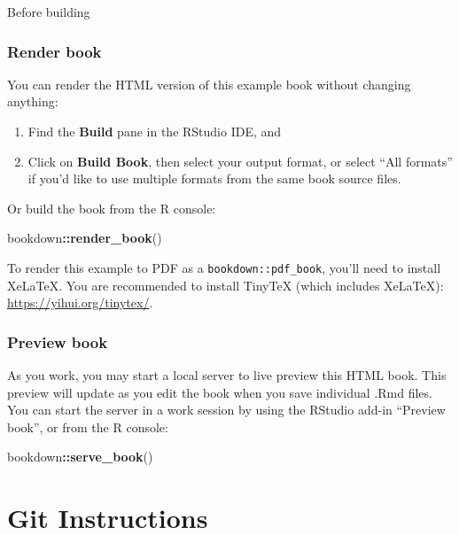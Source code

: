 \documentclass[
]{book}
\newenvironment{Shaded}{\begin{snugshade}}{\end{snugshade}}
\newcommand{\FunctionTok}[1]{\textcolor[rgb]{0.13,0.29,0.53}{\textbf{#1}}}
\newcommand{\NormalTok}[1]{#1}
\newcommand{\SpecialCharTok}[1]{\textcolor[rgb]{0.81,0.36,0.00}{\textbf{#1}}}
\theoremstyle{definition}
\theoremstyle{definition}
\theoremstyle{definition}
\theoremstyle{definition}
\theoremstyle{remark}
\begin{document}
Before building

\subsection{Render book}\label{render-book}

You can render the HTML version of this example book without changing anything:

\begin{enumerate}
\def\labelenumi{\arabic{enumi}.}
\item
  Find the \textbf{Build} pane in the RStudio IDE, and
\item
  Click on \textbf{Build Book}, then select your output format, or select ``All formats'' if you'd like to use multiple formats from the same book source files.
\end{enumerate}

Or build the book from the R console:

\begin{Shaded}
\begin{Highlighting}[]
\NormalTok{bookdown}\SpecialCharTok{::}\FunctionTok{render\_book}\NormalTok{()}
\end{Highlighting}
\end{Shaded}

To render this example to PDF as a \texttt{bookdown::pdf\_book}, you'll need to install XeLaTeX. You are recommended to install TinyTeX (which includes XeLaTeX): \url{https://yihui.org/tinytex/}.

\subsection{Preview book}\label{preview-book}

As you work, you may start a local server to live preview this HTML book. This preview will update as you edit the book when you save individual .Rmd files. You can start the server in a work session by using the RStudio add-in ``Preview book'', or from the R console:

\begin{Shaded}
\begin{Highlighting}[]
\NormalTok{bookdown}\SpecialCharTok{::}\FunctionTok{serve\_book}\NormalTok{()}
\end{Highlighting}
\end{Shaded}

\chapter{Git Instructions}\label{git-instructions}
\end{document}
